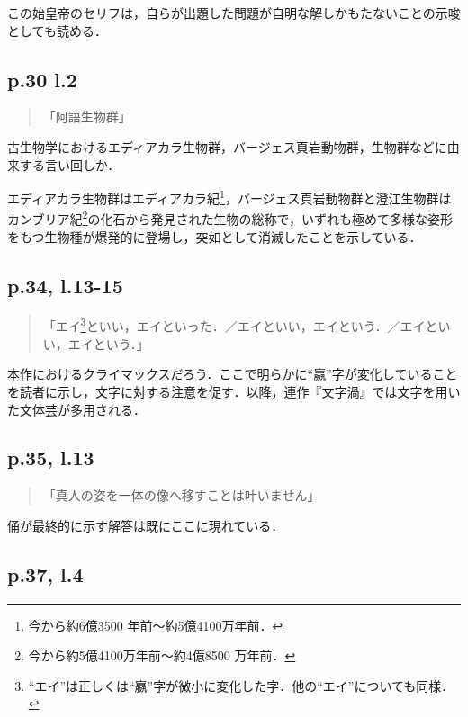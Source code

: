 \documentclass[10pt, a5paper, twoside]{jsarticle}
\theoremstyle{definition}
\begin{document}
		この始皇帝のセリフは，自らが出題した問題が自明な解しかもたないことの示唆としても読める．

		\subsection{p.30 l.2}

		\begin{quote}
			
			「阿語生物群」

		\end{quote}

		古生物学におけるエディアカラ生物群，バージェス頁岩動物群，生物群などに由来する言い回しか．

		エディアカラ生物群はエディアカラ紀\footnote{今から約6億3500
		年前〜約5億4100万年前\cite{ken}．}，バージェス頁岩動物群と澄江生物群はカンブリア紀\footnote{今から約5億4100万年前〜約4億8500
		万年前\cite{ken}．}の化石から発見された生物の総称で，いずれも極めて多様な姿形をもつ生物種が爆発的に登場し，突如として消滅したことを示している．

		\subsection{p.34, l.13-15}

		\begin{quote}

			「エイ\footnote{“エイ”は正しくは“嬴”字が微小に変化した字．他の“エイ”についても同様．}といい，エイといった．／エイといい，エイという．／エイといい，エイという．」

		\end{quote}

		本作におけるクライマックスだろう．ここで明らかに“嬴”字が変化していることを読者に示し，文字に対する注意を促す．以降，連作『文字渦』では文字を用いた文体芸が多用される．

		\subsection{p.35, l.13}

		\begin{quote}
			
			「真人の姿を一体の像へ移すことは叶いません」

		\end{quote}

		俑が最終的に示す解答は既にここに現れている．

		\subsection{p.37, l.4}
\end{document}
